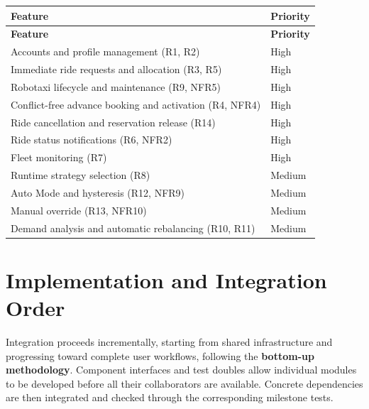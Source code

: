 \documentclass[11pt,a4paper,oneside]{report}
\begin{document}
\begin{longtable}{@{}
    >{\raggedright\arraybackslash}p{}
    >{\raggedright\arraybackslash}p{}
@{}}
\toprule
\textbf{Feature} & \textbf{Priority} \\
\midrule
\endfirsthead
\toprule
\textbf{Feature} & \textbf{Priority} \\
\midrule
\endhead
\bottomrule
\endlastfoot

Accounts and profile management (R1, R2) & High \\
Immediate ride requests and allocation (R3, R5) & High \\
Robotaxi lifecycle and maintenance (R9, NFR5) & High \\
Conflict-free advance booking and activation (R4, NFR4) & High \\
Ride cancellation and reservation release (R14) & High \\
Ride status notifications (R6, NFR2) & High \\
Fleet monitoring (R7) & High \\
Runtime strategy selection (R8) & Medium \\
Auto Mode and hysteresis (R12, NFR9) & Medium \\
Manual override (R13, NFR10) & Medium \\
Demand analysis and automatic rebalancing (R10, R11) & Medium \\

\end{longtable}

\section{Implementation and Integration Order}
\label{implementation-and-integration-order}

Integration proceeds incrementally, starting from shared infrastructure
and progressing toward complete user workflows, following the \textbf{bottom-up methodology}. Component interfaces
and test doubles allow individual modules to be developed before all
their collaborators are available. Concrete dependencies are then
integrated and checked through the corresponding milestone tests.
\end{document}
